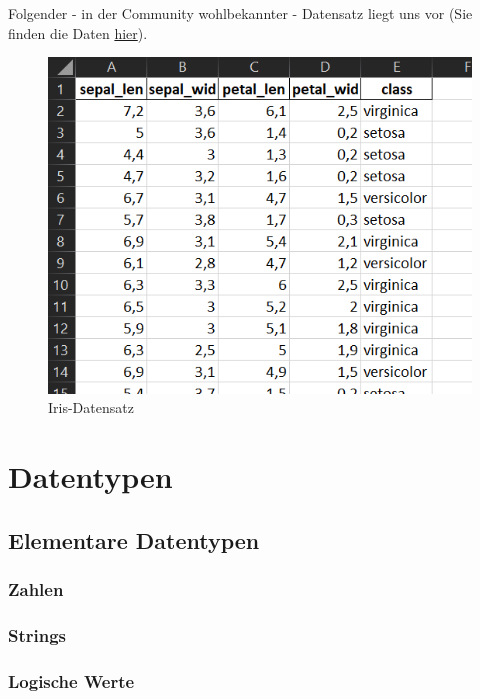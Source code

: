 \documentclass[
  oneside]{book}
\theoremstyle{definition}
\theoremstyle{definition}
\theoremstyle{definition}
\theoremstyle{definition}
\theoremstyle{remark}
\begin{document}
Folgender - in der Community wohlbekannter - Datensatz liegt uns vor (Sie finden die Daten \href{https://syncandshare.lrz.de/getlink/fi89kxTJ5yLRaW5mnpyrofVK/Iris_p.xlsx}{hier}).

\begin{figure}
\centering
\includegraphics{assets/daten.assets/image-20211209101425856-16426070878651.png}
\caption{Iris-Datensatz}
\end{figure}

\hypertarget{datentypen-1}{%
\section{Datentypen}\label{datentypen-1}}

\hypertarget{elementare-datentypen-1}{%
\subsection{Elementare Datentypen}\label{elementare-datentypen-1}}

\hypertarget{zahlen-1}{%
\subsubsection{Zahlen}\label{zahlen-1}}

\hypertarget{strings-1}{%
\subsubsection{Strings}\label{strings-1}}

\hypertarget{logische-werte-1}{%
\subsubsection{Logische Werte}\label{logische-werte-1}}
\end{document}
